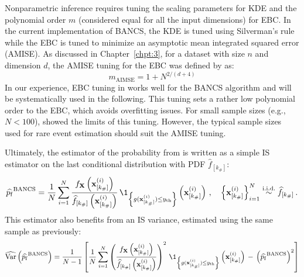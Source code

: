 Nonparametric inference requires tuning the scaling parameters for KDE and the polynomial order $m$ (considered equal for all the input dimensions) for EBC. 
In the current implementation of BANCS, the KDE is tuned using Silverman's rule\footnotemark~\citep{silverman_1981} while the EBC is tuned to minimize an asymptotic mean integrated squared error (AMISE). 
As discussed in Chapter~\ref{chpt:3}, for a dataset with size $n$ and dimension $d$, the AMISE tuning for the EBC was defined by \citet{sancetta_satchell_2004} as:
\begin{equation}\label{eq:amise_tuning}
    m_{\mathrm{AIMSE}} = 1 + N^{2/(d+4)}
\end{equation}
In our experience, EBC tuning in  works well for the BANCS algorithm and will be systematically used in the following. 
This tuning sets a rather low polynomial order to the EBC, which avoids overfitting issues. 
For small sample sizes (e.g., $N<100$), \citet{segers_2017} showed the limits of this tuning. 
However, the typical sample sizes used for rare event estimation should suit the AMISE tuning. 


Ultimately, the estimator of the probability from  is written as a simple IS estimator on the last conditional distribution with PDF $\widehat{f}_{[k_\#]}$:
\begin{equation}
    \widehat{\pf}^{\mathrm{BANCS}} = \frac1N \sum_{i=1}^N \frac{f_\bX\left(\bx_{[k_\#]}^{(i)}\right)}{\widehat{f}_{[k_\#]}\left(\bx_{[k_\#]}^{(i)}\right)} \, \1_{\left\{g(\bx_{[k_\#]}^{(i)}) \leq \yth \right\}}\left(\bx_{[k_\#]}^{(i)}\right)\, , \quad \left\{\bx_{[k_\#]}^{(i)}\right\}_{i=1}^N  \overset{\text{i.i.d.}}{\sim} \widehat{f}_{[k_\#]} \, .
\end{equation}
This estimator also benefits from an IS variance, estimated using the same sample as previously:
\begin{equation}
    \what{\var}\left(\widehat{\pf}^{\mathrm{BANCS}}\right) = \frac{1}{N-1} \left[\frac1N \sum_{i=1}^N \left(\frac{f_\bX\left(\bx_{[k_\#]}^{(i)}\right)}{\widehat{f}_{[k_\#]}\left(\bx_{[k_\#]}^{(i)}\right)}\right)^2 \, \1_{\left\{g(\bx_{[k_\#]}^{(i)}) \leq \yth \right\}}\left(\bx_{[k_\#]}^{(i)}\right) \, - \, \left(\widehat{\pf}^{\mathrm{BANCS}}\right)^2\right]
\end{equation}

